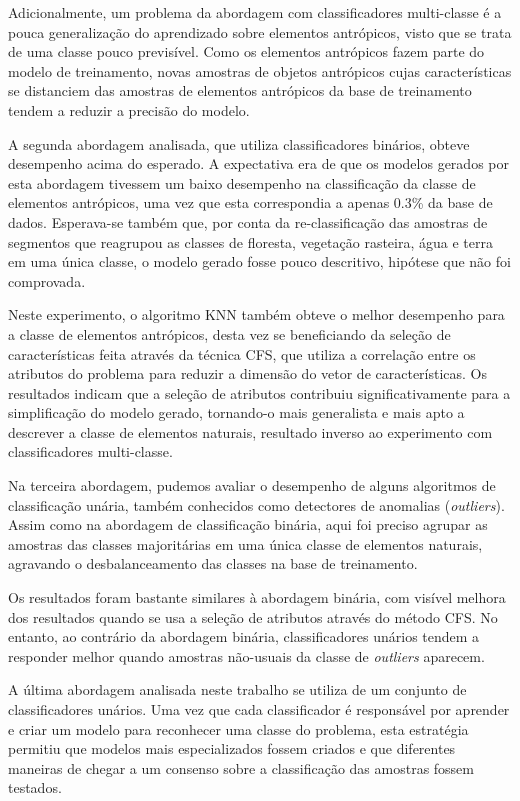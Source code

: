 Adicionalmente, um problema da abordagem com classificadores multi-classe é a pouca generalização do aprendizado sobre elementos antrópicos, visto que se trata de uma classe pouco previsível. Como os elementos antrópicos fazem parte do modelo de treinamento, novas amostras de objetos antrópicos cujas características se distanciem das amostras de elementos antrópicos da base de treinamento tendem a reduzir a precisão do modelo.

A segunda abordagem analisada, que utiliza classificadores binários, obteve desempenho acima do esperado. A expectativa era de que os modelos gerados por esta abordagem tivessem um baixo desempenho na classificação da classe de elementos antrópicos, uma vez que esta correspondia a apenas 0.3\% da base de dados. Esperava-se também que, por conta da re-classificação das amostras de segmentos que reagrupou as classes de floresta, vegetação rasteira, água e terra em uma única classe, o modelo gerado fosse pouco descritivo, hipótese que não foi comprovada.

Neste experimento, o algoritmo KNN também obteve o melhor desempenho para a classe de elementos antrópicos, desta vez se beneficiando da seleção de características feita através da técnica CFS, que utiliza a correlação entre os atributos do problema para reduzir a dimensão do vetor de características. Os resultados indicam que a seleção de atributos contribuiu significativamente para a simplificação do modelo gerado, tornando-o mais generalista e mais apto a descrever a classe de elementos naturais, resultado inverso ao experimento com classificadores multi-classe.

Na terceira abordagem, pudemos avaliar o desempenho de alguns algoritmos de classificação unária, também conhecidos como detectores de anomalias (\textit{outliers}). Assim como na abordagem de classificação binária, aqui foi preciso agrupar as amostras das classes majoritárias em uma única classe de elementos naturais, agravando o desbalanceamento das classes na base de treinamento.

Os resultados foram bastante similares à abordagem binária, com visível melhora dos resultados quando se usa a seleção de atributos através do método CFS. No entanto, ao contrário da abordagem binária, classificadores unários tendem a responder melhor quando amostras não-usuais da classe de \textit{outliers} aparecem.

A última abordagem analisada neste trabalho se utiliza de um conjunto de classificadores unários. Uma vez que cada classificador é responsável por aprender e criar um modelo para reconhecer uma classe do problema, esta estratégia permitiu que modelos mais especializados fossem criados e que diferentes maneiras de chegar a um consenso sobre a classificação das amostras fossem testados.

